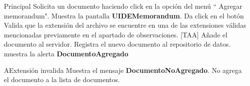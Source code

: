 \begin{UCtrayectoria}{Principal}
  \UCpaso[\UCactor] Solicita un documento haciendo click en la opción del menú `` Agregar memorandum".
  \UCpaso Muestra la pantalla  {\bf UIDEMemorandum}.
  \UCpaso[\UCactor] Da click en el botón 
  \UCpaso Valida que la extensión del archivo se encuentre en una de las extensiones válidas mencionadas previamente en el apartado de observaciones. [TAA]
  \UCpaso Añade el documento al servidor.
  \UCpaso Registra el nuevo documento al repositorio de datos. 
  \UCpaso muestra la alerta {\bf DocumentoAgregado}

\end{UCtrayectoria}

\begin{UCtrayectoriaA}{A}{Extensión invalida} 
\UCpaso Muestra el mensaje {\bf DocumentoNoAgregado}.
  \UCpaso No agrega el documento a la lista de documentos.
\end{UCtrayectoriaA}


